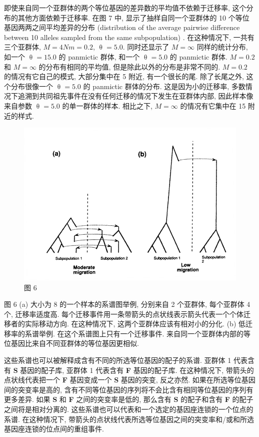 \documentclass[12pt]{article}
\begin{document}
即使来自同一个亚群体的两个等位基因的差异数的平均值不依赖于迁移率, 这个分布的其他方面依赖于迁移率. 在图 7 中,
显示了抽样自同一个亚群体的 10 个等位基因两两之间平均差异的分布 (distribution of the average pairwise difference
between 10 alleles sampled from the same subpopulation) . 在这种情况下, 一共有三个亚群体, $M=4Nm=0.2$,
$\uptheta =5.0$. 同时还显示了 $M=\mathrm{\infty}$ 同样的统计分布, 如一个 $\uptheta =15.0$ 的 panmictic 群体,
和一个 $\uptheta =5.0$ 的 panmictic 群体. $M=0.2$ 和 $M=\mathrm{\infty}$ 的分布有相同的平均值,
但是除此以外的分布是非常不同的. $M=0.2$ 的情况有它自己的模式, 大部分集中在 5 附近, 有一个很长的尾. 除了长尾之外,
这个分布很像一个 $\uptheta =5.0$ 的 panmictic 群体的分布. 这是因为小的迁移率,
多数情况下追溯到共同祖先事件在没有任何迁移的情况下发生在亚群体内部, 因此样本像来自参数 $\uptheta =5.0$ 的单一群体的样本.
相比之下, $M=\mathrm{\infty }$ 的情况有它集中在 15 附近的样式.

\begin{figure}
    \centering
    \includegraphics{coalescent-process.images/image6.png}
    \caption{图 6}
\end{figure}

图 6 (a) 大小为 8 的一个样本的系谱图举例, 分别来自 2 个亚群体, 每个亚群体 4 个, 迁移率适度高.
每个迁移事件用一条带箭头的点状线表示箭头代表一个个体迁移者的实际移动方向. 在这种情况下, 这两个亚群体应该有相对小的分化.
(b) 低迁移率的系谱举例. 在这个系谱图上只有一个迁移事件. 来自同一个亚群体内部的等位基因比来自不同亚群体的等位基因更相似.

这些系谱也可以被解释成含有不同的所选等位基因的配子的系谱. 亚群体 1 代表含有 \textbf{S} 基因的配子库, 亚群体 1 代表含有
\textbf{F} 基因的配子库. 在这种情况下, 带箭头的点状线代表把一个 \textbf{F} 基因变成一个 \textbf{S} 基因的突变,
反之亦然. 如果在所选等位基因间的突变率是高的, 含有不同等位基因的序列将不会比含有相同等位基因的序列有更多差异. 如果
\textbf{S} 和 \textbf{F} 之间的突变率是低的, 那么含有 \textbf{S} 的配子和含有 \textbf{F}
的配子之间将是相对分离的. 这些系谱也可以代表和一个选定的基因座连锁的一个位点的系谱. 在这种情况下,
带箭头的点状线代表所选等位基因之间的突变率和/或和所选基因座连锁的位点间的重组事件.
\end{document}
